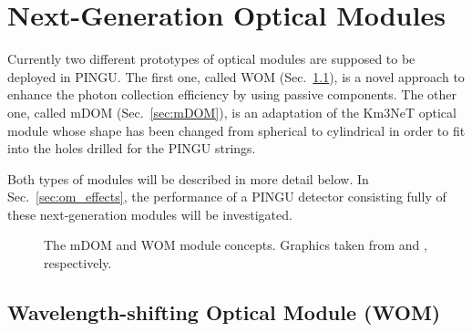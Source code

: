\section{Next-Generation Optical Modules}
\label{sec:Gen2DOM}

Currently two different prototypes of optical modules are supposed to be
deployed in PINGU. The first one, called WOM (Sec.~\ref{sec:WOM}), is a novel
approach to enhance the photon collection efficiency by using passive
components. The other one, called mDOM (Sec.~\ref{sec:mDOM}), is an
adaptation of the Km3NeT optical module \cite{Km3NeTmodule} whose shape has been
changed from spherical to cylindrical in order to fit into the holes drilled for
the PINGU strings. 

Both types of modules will be described in more detail below. In
Sec.~\ref{sec:om_effects}, the performance of a PINGU detector consisting fully
of these next-generation modules will be investigated.


\begin{figure}
\centering
  \qquad
  \caption{The \protect{} mDOM and \protect{} WOM
    module concepts. Graphics taken from \cite{mDOM_Geneva} and \cite{WOM_ICRC},
    respectively.}
\label{fig:Gen3modules}
\end{figure}


\subsection{Wavelength-shifting Optical Module (WOM)}
\label{sec:WOM}


